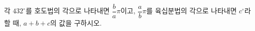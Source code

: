 각 $432^\circ$를 호도법의 각으로 나타내면 $\dfrac{b}{a}\pi$이고, $\dfrac{a}{b}\pi$를 육십분법의 각으로 나타내면 $c^\circ$라 할 때, $a+b+c$의 값을 구하시오. 
